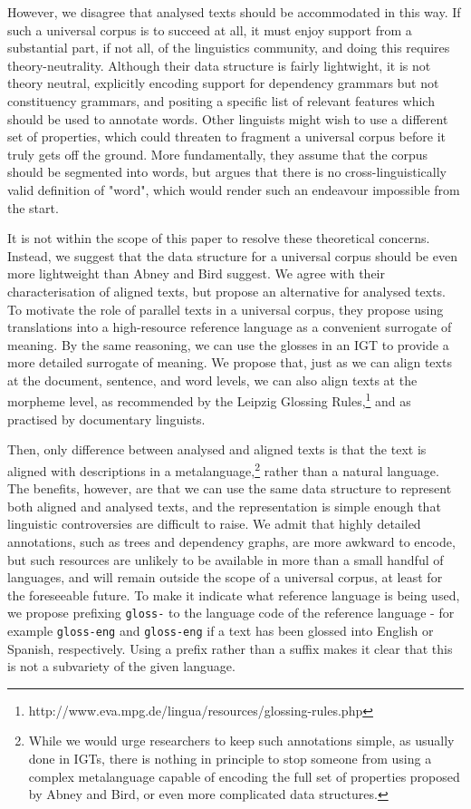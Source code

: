 \documentclass[11pt]{article}
\begin{document}
However, we disagree that analysed texts should be accommodated in this way. If such a universal corpus is to succeed at all, it must enjoy support from a substantial part, if not all, of the linguistics community, and doing this requires theory-neutrality. Although their data structure is fairly lightwight, it is not theory neutral, explicitly encoding support for dependency grammars but not constituency grammars, and positing a specific list of relevant features which should be used to annotate words. Other linguists might wish to use a different set of properties, which could threaten to fragment a universal corpus before it truly gets off the ground. More fundamentally, they assume that the corpus should be segmented into words, but  argues that there is no cross-linguistically valid definition of "word", which would render such an endeavour impossible from the start.

It is not within the scope of this paper to resolve these theoretical concerns. Instead, we suggest that the data structure for a universal corpus should be even more lightweight than Abney and Bird suggest. We agree with their characterisation of aligned texts, but propose an alternative for analysed texts. To motivate the role of parallel texts in a universal corpus, they propose using translations into a high-resource reference language as a convenient surrogate of meaning. By the same reasoning, we can use the glosses in an IGT to provide a more detailed surrogate of meaning. We propose that, just as we can align texts at the document, sentence, and word levels, we can also align texts at the morpheme level, as recommended by the Leipzig Glossing Rules,\footnote{http://www.eva.mpg.de/lingua/resources/glossing-rules.php} and as practised by documentary linguists.

Then, only difference between analysed and aligned texts is that the text is aligned with descriptions in a metalanguage,\footnote{While we would urge researchers to keep such annotations simple, as usually done in IGTs, there is nothing in principle to stop someone from using a complex metalanguage capable of encoding the full set of properties proposed by Abney and Bird, or even more complicated data structures.} rather than a natural language. The benefits, however, are that we can use the same data structure to represent both aligned and analysed texts, and the representation is simple enough that linguistic controversies are difficult to raise. We admit that highly detailed annotations, such as trees and dependency graphs, are more awkward to encode, but such resources are unlikely to be available in more than a small handful of languages, and will remain outside the scope of a universal corpus, at least for the foreseeable future. To make it indicate what reference language is being used, we propose prefixing \texttt{gloss-} to the language code of the reference language - for example \texttt{gloss-eng} and \texttt{gloss-eng} if a text has been glossed into English or Spanish, respectively. Using a prefix rather than a suffix makes it clear that this is not a subvariety of the given language.
\end{document}
